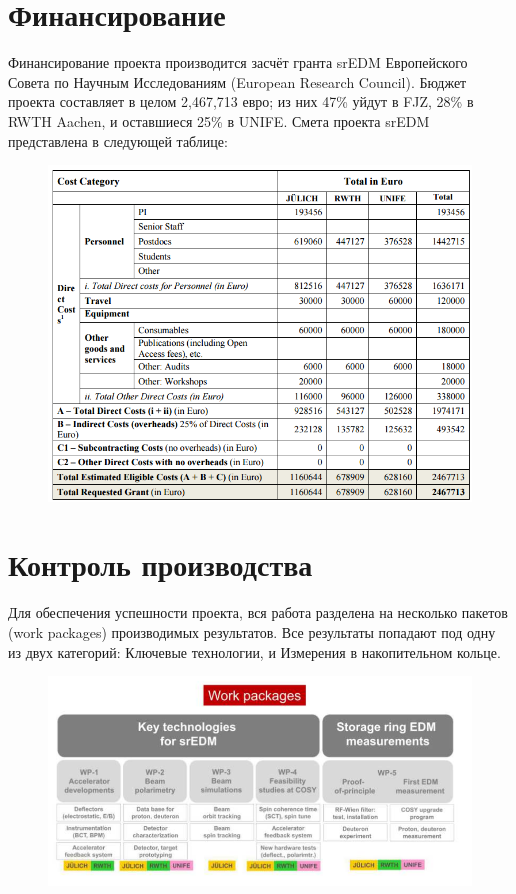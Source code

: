 \documentclass{extarticle}
\begin{document}
\section{Финансирование}
Финансирование проекта производится засчёт гранта srEDM Европейского Совета по Научным Исследованиям (European Research Council). Бюджет проекта составляет в целом  2,467,713 евро; из них 47\% уйдут в FJZ, 28\% в RWTH Aachen, и оставшиеся 25\% в UNIFE. Смета проекта srEDM представлена в следующей таблице:

\begin{figure}[H]
	\centering
	\includegraphics[scale=.7]{img/Costs_Table}
\end{figure}

\section{Контроль производства}
Для обеспечения успешности проекта, вся работа разделена на несколько пакетов (work packages) производимых результатов. Все результаты попадают под одну из двух категорий: Ключевые технологии, и Измерения в накопительном кольце.

\begin{figure}[H]
	\centering
	\includegraphics[scale=.5]{img/Work_packages}
\end{figure}
		
\end{document}
